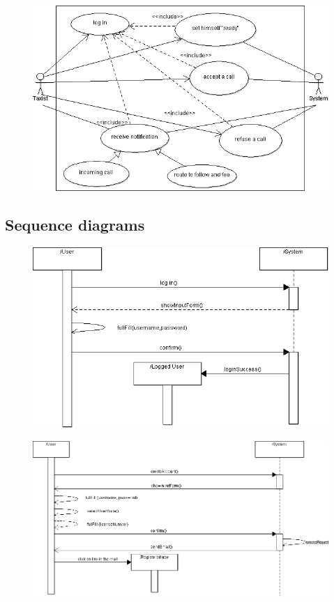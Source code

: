 \begin{itemize}
  \begin{figure} [h]
  \centering
  \includegraphics [scale=0.5]{taxist.png}
  \end{figure}

\end{itemize}

\newpage

\subsection{Sequence diagrams}
  \begin{figure} [h]
  \centering
  \includegraphics [scale=0.5]{sequencelogin.png}
  \end{figure}
\newpage

  \begin{figure} [h]
  \centering
  \includegraphics [scale=0.4]{sequenceregister.png}
  \end{figure}
\newpage

